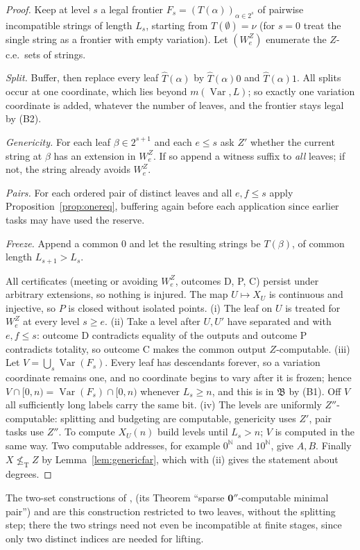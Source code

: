 \documentclass[11pt,letterpaper]{article}
\theoremstyle{definition}
\numberwithin{equation}{section}
\newcommand{\N}{\mathbb N}
\newcommand{\nleT}{\nleq_{\mathrm T}}
\newcommand{\Var}{\operatorname{Var}}
\newcommand{\zero}{\mathbf 0}
\newcommand{\bud}{\mathfrak B}
\newcommand{\rep}[1]{\leavevmode{\sffamily\small\color{Steel}R#1}}
\begin{document}
\begin{proof}
Keep at level $s$ a legal frontier $F_s=(T(\alpha))_{\alpha\in2^s}$ of pairwise incompatible strings of length $L_s$, starting from $T(\emptyset)=\nu$ (for $s=0$ treat the single string as a frontier with empty variation). Let $(W^Z_e)$ enumerate the $Z$-c.e.\ sets of strings.

\emph{Split.} Buffer, then replace every leaf $\widehat T(\alpha)$ by $\widehat T(\alpha)0$ and $\widehat T(\alpha)1$. All splits occur at one coordinate, which lies beyond $m(\Var,L)$; so exactly one variation coordinate is added, whatever the number of leaves, and the frontier stays legal by (B2).

\emph{Genericity.} For each leaf $\beta\in2^{s+1}$ and each $e\le s$ ask $Z'$ whether the current string at $\beta$ has an extension in $W^Z_e$. If so append a witness suffix to \emph{all} leaves; if not, the string already avoids $W^Z_e$.

\emph{Pairs.} For each ordered pair of distinct leaves and all $e,f\le s$ apply Proposition~\ref{prop:onereq}, buffering again before each application since earlier tasks may have used the reserve.

\emph{Freeze.} Append a common $0$ and let the resulting strings be $T(\beta)$, of common length $L_{s+1}>L_s$.

All certificates (meeting or avoiding $W^Z_e$, outcomes D, P, C) persist under arbitrary extensions, so nothing is injured. The map $U\mapsto X_U$ is continuous and injective, so $P$ is closed without isolated points. (i) The leaf on $U$ is treated for $W^Z_e$ at every level $s\ge e$. (ii) Take a level after $U,U'$ have separated and with $e,f\le s$: outcome D contradicts equality of the outputs and outcome P contradicts totality, so outcome C makes the common output $Z$-computable. (iii) Let $V=\bigcup_s\Var(F_s)$. Every leaf has descendants forever, so a variation coordinate remains one, and no coordinate begins to vary after it is frozen; hence $V\cap[0,n)=\Var(F_s)\cap[0,n)$ whenever $L_s\ge n$, and this is in $\bud$ by (B1). Off $V$ all sufficiently long labels carry the same bit. (iv) The levels are uniformly $Z''$-computable: splitting and budgeting are computable, genericity uses $Z'$, pair tasks use $Z''$. To compute $X_U(n)$ build levels until $L_s>n$; $V$ is computed in the same way. Two computable addresses, for example $0^\N$ and $10^\N$, give $A,B$. Finally $X\nleT Z$ by Lemma~\ref{lem:genericfar}, which with (ii) gives the statement about degrees.
\end{proof}
The two-set constructions of \rep2, \rep6 (its Theorem ``sparse $\zero''$-computable minimal pair'') and \rep7 are this construction restricted to two leaves, without the splitting step; there the two strings need not even be incompatible at finite stages, since only two distinct indices are needed for lifting.
\end{document}

